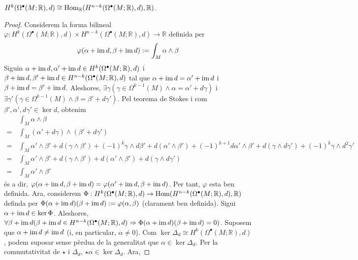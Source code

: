 \begin{teorema}
    $H^{k}(\Omega^{\bullet}(M;\mathbb{R}),d)\cong\operatorname{Hom}_{\mathbb{R}}(H^{n-k}(\Omega^{\bullet}(M;\mathbb{R}),d),\mathbb{R})$.
    \begin{proof}
        Considerem la forma bilineal $\varphi:H^{k}(\Omega^{\bullet}(M;\mathbb{R}),d)\times H^{n-k}(\Omega^{\bullet}(M;\mathbb{R}),d)\rightarrow\mathbb{R}$ definida per
        \begin{equation*}
            \varphi(\alpha+\operatorname{im}{d},\beta+\operatorname{im}{d}):=\int_{M}\alpha\wedge\beta
        \end{equation*}
        Siguin $\alpha+\operatorname{im}{d},\alpha'+\operatorname{im}{d}\in H^{k}(\Omega^{\bullet}(M;\mathbb{R}),d)$ i $\beta+\operatorname{im}{d},\beta'+\operatorname{im}{d}\in H^{n-k}(\Omega^{\bullet}(M;\mathbb{R}),d)$ tal que $\alpha+\operatorname{im}{d}=\alpha'+\operatorname{im}{d}$ i $\beta+\operatorname{im}{d}=\beta'+\operatorname{im}{d}$. Aleshores, $\exists\gamma(\gamma\in\Omega^{k-1}(M)\land\alpha=\alpha'+d\gamma)$ i $\exists\gamma'(\gamma\in\Omega^{k-1}(M)\land\beta=\beta'+d\gamma')$. Pel teorema de Stokes i com $\beta',\alpha',d\gamma'\in\ker{d}$, obtenim
        \begin{align*}
            &\int_{M}\alpha\wedge\beta\\
            =\,
            &\int_{M}(\alpha'+d\gamma)\wedge(\beta'+d\gamma')\\
            =\,
            &\int_{M}\alpha'\wedge\beta'
            +d(\gamma\wedge\beta')
            +(-1)^{k}\gamma\wedge d\beta'
            +d(\alpha'\wedge\beta')
            +(-1)^{k+1}d\alpha'\wedge\beta'
            +d(\gamma\wedge d\gamma')
            +(-1)^{k}\gamma\wedge d^{2}\gamma'\\
            =\,
            &\int_{M}\alpha'\wedge\beta'
            +d(\gamma\wedge\beta')
            +d(\alpha'\wedge\beta')
            +d(\gamma\wedge d\gamma')\\
            =\,
            &\int_{M}\alpha'\wedge\beta'
        \end{align*}
        és a dir, $\varphi(\alpha+\operatorname{im}{d},\beta+\operatorname{im}{d})=\varphi(\alpha'+\operatorname{im}{d},\beta+\operatorname{im}{d})$. Per tant, $\varphi$ esta ben definida.\newline
        Ara, considerem $\Phi:H^{k}(\Omega^{\bullet}(M;\mathbb{R}),d)\rightarrow\operatorname{Hom}(H^{n-k}(\Omega^{\bullet}(M;\mathbb{R}),d),\mathbb{R})$ definda per $\Phi(\alpha+\operatorname{im}{d})(\beta+\operatorname{im}{d}):=\varphi(\alpha,\beta)$ (clarament ben definida). Sigui $\alpha+\operatorname{im}{d}\in\ker{\Phi}$. Aleshores, $\forall\beta+\operatorname{im}{d}(\beta+\operatorname{im}{d}\in H^{n-k}(\Omega^{\bullet}(M;\mathbb{R}),d)\Rightarrow\Phi(\alpha+\operatorname{im}{d})(\beta+\operatorname{im}{d})=0)$. Suposem que $\alpha+\operatorname{im}{d}\neq\operatorname{im}{d}$ (i, en particular, $\alpha\neq0$). Com $\ker{\Delta_{d}}\cong H^{k}(\Omega^{\bullet}(M;\mathbb{R}),d)$, podem suposar sense pèrdua de la generalitat que $\alpha\in\ker{\Delta_{d}}$. Per la commutativitat de $\star$ i $\Delta_{d}$, $\star\alpha\in\ker{\Delta_{d}}$. Ara,

\end{proof}
\end{teorema}
